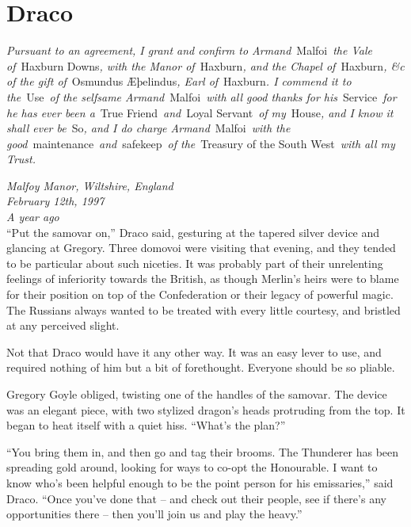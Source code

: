 \Startbonus

\hypertarget{draco}{%
\chapter{Draco}\label{draco}}

\emph{Pursuant to an agreement, I grant and confirm to
Armand}~Malfoi~\emph{the Vale of}~Haxburn Downs\emph{, with the Manor
of}~Haxburn\emph{, and the Chapel of}~Haxburn\emph{, \&c of the gift
of}~Osmundus Æþelindus\emph{, Earl of}~Haxburn\emph{. I commend it to
the}~Use~\emph{of the selfsame Armand}~Malfoi~\emph{with all good thanks
for his}~Service~\emph{for he has ever been a}~True
Friend~\emph{and}~Loyal Servant~\emph{of my}~House\emph{, and I know it
shall ever be}~So\emph{, and I do charge Armand}~Malfoi~\emph{with the
good}~maintenance~\emph{and}~safekeep~\emph{of the}~Treasury of the
South West~\emph{with all my Trust.}\\

\emph{}

\mybreak

\emph{Malfoy Manor, Wiltshire, England}\\
\emph{February 12th, 1997}\\
\emph{A year ago}\\

``Put the samovar on,'' Draco said, gesturing at the tapered silver
device and glancing at Gregory. Three domovoi were visiting that
evening, and they tended to be particular about such niceties. It was
probably part of their unrelenting feelings of inferiority towards the
British, as though Merlin's heirs were to blame for their position on
top of the Confederation or their legacy of powerful magic. The Russians
always wanted to be treated with every little courtesy, and bristled at
any perceived slight.

Not that Draco would have it any other way. It was an easy lever to use,
and required nothing of him but a bit of forethought. Everyone should be
so pliable.

Gregory Goyle obliged, twisting one of the handles of the samovar. The
device was an elegant piece, with two stylized dragon's heads protruding
from the top. It began to heat itself with a quiet hiss. ``What's the
plan?''

``You bring them in, and then go and tag their brooms. The Thunderer has
been spreading gold around, looking for ways to co-opt the Honourable. I
want to know who's been helpful enough to be the point person for his
emissaries,'' said Draco. ``Once you've done that -- and check out their
people, see if there's any opportunities there -- then you'll join us
and play the heavy.''

